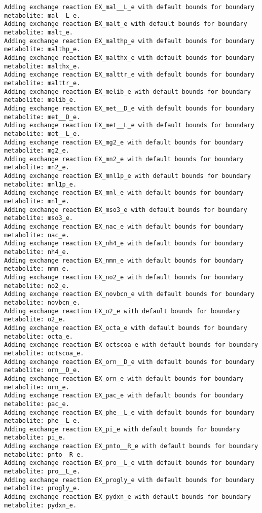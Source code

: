 \documentclass[
  letterpaper,
  DIV=11,
  numbers=noendperiod]{scrartcl}
\begin{document}
\begin{verbatim}
Adding exchange reaction EX_mal__L_e with default bounds for boundary metabolite: mal__L_e.
Adding exchange reaction EX_malt_e with default bounds for boundary metabolite: malt_e.
Adding exchange reaction EX_malthp_e with default bounds for boundary metabolite: malthp_e.
Adding exchange reaction EX_malthx_e with default bounds for boundary metabolite: malthx_e.
Adding exchange reaction EX_malttr_e with default bounds for boundary metabolite: malttr_e.
Adding exchange reaction EX_melib_e with default bounds for boundary metabolite: melib_e.
Adding exchange reaction EX_met__D_e with default bounds for boundary metabolite: met__D_e.
Adding exchange reaction EX_met__L_e with default bounds for boundary metabolite: met__L_e.
Adding exchange reaction EX_mg2_e with default bounds for boundary metabolite: mg2_e.
Adding exchange reaction EX_mn2_e with default bounds for boundary metabolite: mn2_e.
Adding exchange reaction EX_mnl1p_e with default bounds for boundary metabolite: mnl1p_e.
Adding exchange reaction EX_mnl_e with default bounds for boundary metabolite: mnl_e.
Adding exchange reaction EX_mso3_e with default bounds for boundary metabolite: mso3_e.
Adding exchange reaction EX_nac_e with default bounds for boundary metabolite: nac_e.
Adding exchange reaction EX_nh4_e with default bounds for boundary metabolite: nh4_e.
Adding exchange reaction EX_nmn_e with default bounds for boundary metabolite: nmn_e.
Adding exchange reaction EX_no2_e with default bounds for boundary metabolite: no2_e.
Adding exchange reaction EX_novbcn_e with default bounds for boundary metabolite: novbcn_e.
Adding exchange reaction EX_o2_e with default bounds for boundary metabolite: o2_e.
Adding exchange reaction EX_octa_e with default bounds for boundary metabolite: octa_e.
Adding exchange reaction EX_octscoa_e with default bounds for boundary metabolite: octscoa_e.
Adding exchange reaction EX_orn__D_e with default bounds for boundary metabolite: orn__D_e.
Adding exchange reaction EX_orn_e with default bounds for boundary metabolite: orn_e.
Adding exchange reaction EX_pac_e with default bounds for boundary metabolite: pac_e.
Adding exchange reaction EX_phe__L_e with default bounds for boundary metabolite: phe__L_e.
Adding exchange reaction EX_pi_e with default bounds for boundary metabolite: pi_e.
Adding exchange reaction EX_pnto__R_e with default bounds for boundary metabolite: pnto__R_e.
Adding exchange reaction EX_pro__L_e with default bounds for boundary metabolite: pro__L_e.
Adding exchange reaction EX_progly_e with default bounds for boundary metabolite: progly_e.
Adding exchange reaction EX_pydxn_e with default bounds for boundary metabolite: pydxn_e.

\end{verbatim}
\end{document}
